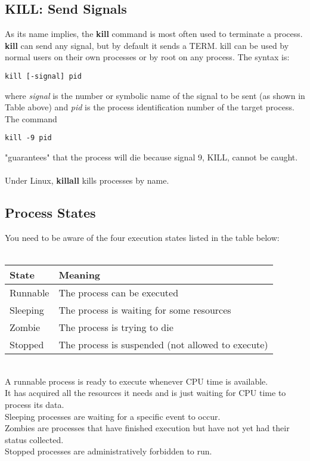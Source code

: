 \documentclass[10pt,letterpaper]{book}
\begin{document}
\subsection{KILL: Send Signals}
As its name implies, the \textbf{kill} command is most often used to terminate a process.\\
\textbf{kill} can send any signal, but by default it sends a TERM. kill can be used by normal users on their own processes or by root on any process. The syntax is:
\begin{lstlisting}
kill [-signal] pid
\end{lstlisting}
where \textit{signal} is the number or symbolic name of the signal to be sent (as shown in Table above) and \textit{pid} is the process identification number of the target process.\\
The command
\begin{lstlisting}
kill -9 pid
\end{lstlisting}
"guarantees" that the process will die because signal 9, KILL, cannot be caught.\\
\\
Under Linux, \textbf{killall} kills processes by name.
\subsection{Process States}
You need to be aware of the four execution states listed in the table below:\\
\\
\begin{tabular}{l l}
\hline
\textbf{State} & \textbf{Meaning}\\
\hline 
Runnable & The process can be executed\\
Sleeping & The process is waiting for some resources\\
Zombie & The process is trying to die\\
Stopped & The process is suspended (not allowed to execute)\\
\hline
\end{tabular}
\\
A runnable process is ready to execute whenever CPU time is available.\\
It has acquired all the resources it needs and is just waiting for CPU time to process its data.\\
Sleeping processes are waiting for a specific event to occur.\\
Zombies are processes that have finished execution but have not yet had their
status collected.\\
Stopped processes are administratively forbidden to run.
\end{document}

